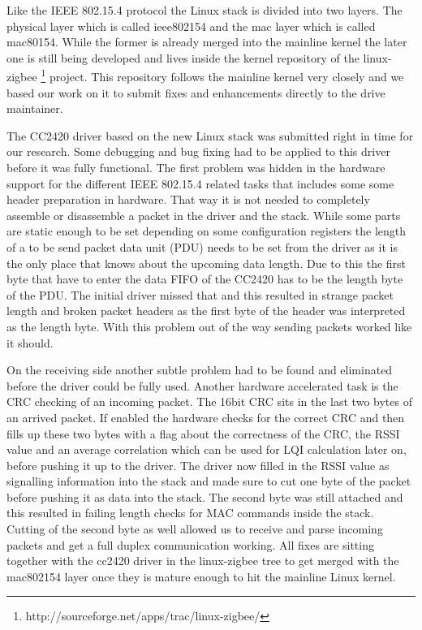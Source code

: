 Like the IEEE 802.15.4 protocol the Linux stack is divided into two layers. The
physical layer which is called ieee802154 and the mac layer which is called
mac80154. While the former is already merged into the mainline kernel the later
one is still being developed and lives inside the kernel repository of the
linux-zigbee \footnote{http://sourceforge.net/apps/trac/linux-zigbee/} project.
This repository follows the mainline kernel very closely
and we based our work on it to submit fixes and enhancements directly to the
drive  maintainer.

The CC2420 driver based on the new Linux stack was submitted right in time for
our research. Some debugging and bug fixing had to be applied to this driver
before it was fully functional. The first problem was hidden in the hardware
support for the different IEEE 802.15.4 related tasks that includes
some some header preparation in hardware. That way it is not needed to
completely assemble or disassemble a packet in the driver and the stack. While
some parts are static enough to be set depending on some configuration registers
the length of a to be send packet data unit (PDU) needs to be set from the driver
as it is the only place that knows about the upcoming data length. Due to this
the first byte that have to enter the data FIFO of the CC2420 has to be the
length byte of the PDU. The initial driver missed that and this resulted in
strange packet length and broken packet headers as the first byte of the header
was interpreted as the length byte. With this problem out of the way sending
packets worked like it should.

On the receiving side another subtle problem had to be found and eliminated
before the driver could be fully used. Another hardware accelerated task is the
CRC checking of an incoming packet. The 16bit CRC sits in the last two bytes of
an arrived packet. If enabled the hardware checks for the correct CRC and
then fills up these two bytes with a flag about the correctness of the CRC, the
RSSI value and an average correlation which can be used for LQI calculation
later on, before pushing it up to the driver. The driver now filled in the RSSI
value as signalling information into the stack and made sure to cut one byte
of the packet before pushing it as data into the stack. The second byte was
still attached and this resulted in failing length checks for MAC commands
inside the stack. Cutting of the second byte as well allowed us to receive
and parse incoming packets and get a full duplex communication working. All
fixes are sitting together with the cc2420 driver in the linux-zigbee tree to
get merged with the mac802154 layer once they is mature enough to hit the
mainline Linux kernel.

